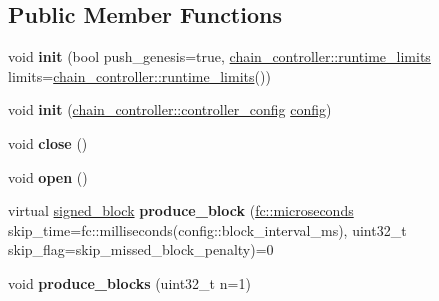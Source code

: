 \subsection*{Public Member Functions}
\begin{DoxyCompactItemize}
\item 
\mbox{\label{classaacio_1_1testing_1_1base__tester_a54ff0e2c7c8fea25827c59b161cad31b}} 
void {\bfseries init} (bool push\+\_\+genesis=true, \mbox{\hyperlink{structaacio_1_1chain_1_1chain__controller_1_1runtime__limits}{chain\+\_\+controller\+::runtime\+\_\+limits}} limits=\mbox{\hyperlink{structaacio_1_1chain_1_1chain__controller_1_1runtime__limits}{chain\+\_\+controller\+::runtime\+\_\+limits}}())
\item 
\mbox{\label{classaacio_1_1testing_1_1base__tester_a2505f8417e9e4b6e8078bad7f2c9a7a2}} 
void {\bfseries init} (\mbox{\hyperlink{structaacio_1_1chain_1_1chain__controller_1_1controller__config}{chain\+\_\+controller\+::controller\+\_\+config}} \mbox{\hyperlink{classconfig}{config}})
\item 
\mbox{\label{classaacio_1_1testing_1_1base__tester_af17ca39b166f7be2c769e777ab8a16cd}} 
void {\bfseries close} ()
\item 
\mbox{\label{classaacio_1_1testing_1_1base__tester_a8fb58ffa1557b5813bd971c4dd5a1a4a}} 
void {\bfseries open} ()
\item 
\mbox{\label{classaacio_1_1testing_1_1base__tester_ac49f36254cbecbf509102777a3d4b593}} 
virtual \mbox{\hyperlink{structaacio_1_1chain_1_1signed__block}{signed\+\_\+block}} {\bfseries produce\+\_\+block} (\mbox{\hyperlink{classfc_1_1microseconds}{fc\+::microseconds}} skip\+\_\+time=fc\+::milliseconds(config\+::block\+\_\+interval\+\_\+ms), uint32\+\_\+t skip\+\_\+flag=skip\+\_\+missed\+\_\+block\+\_\+penalty)=0
\item 
\mbox{\label{classaacio_1_1testing_1_1base__tester_aa9e5773f6264c951a6378bce275f124c}} 
void {\bfseries produce\+\_\+blocks} (uint32\+\_\+t n=1)
\item 
\mbox{\label{classaacio_1_1testing_1_1base__tester_a5a3edd6d171f95e9be990e81564cafa6}} 

\end{DoxyCompactItemize}

